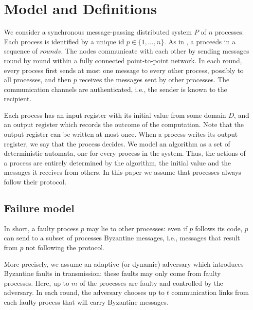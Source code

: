 \section{Model and Definitions}
 
We consider a synchronous message-passing distributed system $P$ of $n$ processes. 
Each process is
identified by a unique id $p \in \{ 1, \ldots ,n \}$.  
As in {\cite{lamport1982byzantine,toueg1984simple}}, a
{} proceeds in a sequence of $rounds$.    
 The nodes communicate
with each other by sending messages round by round within a fully
connected 
point-to-point network.
In each round, every process first sends at most one message to every other process, possibly to all processes, 
and then $p$ receives the messages sent
by other  processes. The communication channels are authenticated, i.e., the sender is known to the recipient. 

Each process has
an input register with its initial value from some domain $D$, and an
output register  
which records the outcome of the computation.
Note that the output register can be written at most once. When a
process writes its output register, we say that the process decides.
We model an algorithm as a set of deterministic automata, one for
every process in the system. 
Thus, the actions of a process are entirely determined by the
algorithm, the initial value and the messages it receives from others. 
In this paper we assume that processes always follow their protocol.


\subsection{Failure model}
In short, a faulty process $p$ may lie to other processes: even if $p$ follows its code, $p$ can send to a subset of processes Byzantine messages, i.e., messages that result from $p$ not following the protocol.

More precisely, we assume an adaptive (or dynamic) adversary
which introduces Byzantine faults in transmission: these faults may
only come from faulty processes. Here, up to $m$ of the
processes are 
faulty and controlled by the adversary. In each round, the adversary chooses
up to $t$ communication links from each faulty process that
will carry Byzantine messages. 


